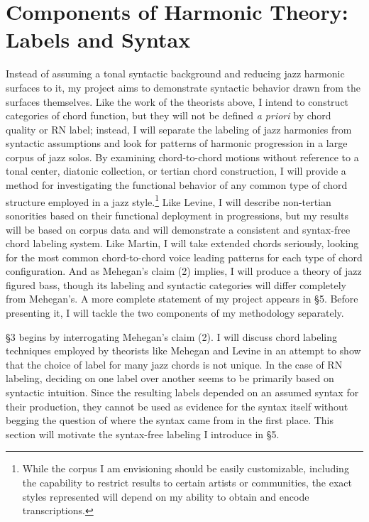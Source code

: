 \section{Components of Harmonic Theory: Labels and Syntax}
Instead of assuming a tonal syntactic background and reducing jazz harmonic surfaces to it, my project aims to demonstrate syntactic behavior drawn from the surfaces themselves.  Like the work of the theorists above, I intend to construct categories of chord function, but they will not be defined \emph{a priori} by chord quality or RN label; instead, I will separate the labeling of jazz harmonies from syntactic assumptions and look for patterns of harmonic progression in a large corpus of jazz solos.  By examining chord-to-chord motions without reference to a tonal center, diatonic collection, or tertian chord construction, I will provide a method for investigating the functional behavior of any common type of chord structure employed in a jazz style.\footnote{While the corpus I am envisioning should be easily customizable, including the capability to restrict results to certain artists or communities, the exact styles represented will depend on my ability to obtain and encode transcriptions.}  Like Levine, I will describe non-tertian sonorities based on their functional deployment in progressions, but my results will be based on corpus data and will demonstrate a consistent and syntax-free chord labeling system.  Like Martin, I will take extended chords seriously, looking for the most common chord-to-chord voice leading patterns for each type of chord configuration.  And as Mehegan's claim (2) implies, I will produce a theory of jazz figured bass, though its labeling and syntactic categories will differ completely from Mehegan's.  A more complete statement of my project appears in \S 5.  Before presenting it, I will tackle the two components of my methodology separately.

\S 3 begins by interrogating Mehegan's claim (2).  I will discuss chord labeling techniques employed by theorists like Mehegan and Levine in an attempt to show that the choice of label for many jazz chords is not unique.  In the case of RN labeling, deciding on one label over another seems to be primarily based on syntactic intuition.  Since the resulting labels depended on an assumed syntax for their production, they cannot be used as evidence for the syntax itself without begging the question of where the syntax came from in the first place.  This section will motivate the syntax-free labeling I introduce in \S 5.

